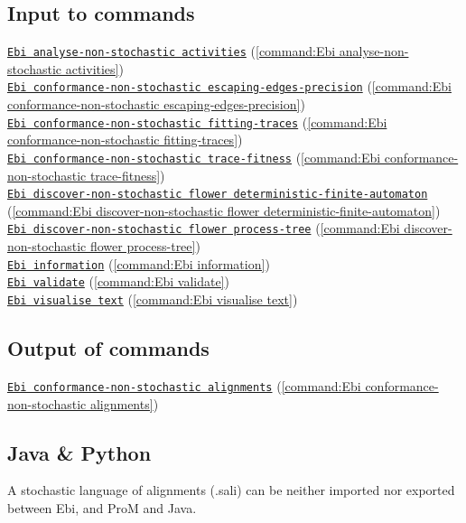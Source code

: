 {\subsection*{Input to commands} \null\qquad\hyperref[command:Ebi analyse-non-stochastic activities]{\texttt{Ebi analyse-non-stochastic activities}} (\cref{command:Ebi analyse-non-stochastic activities})\\\null\qquad\hyperref[command:Ebi conformance-non-stochastic escaping-edges-precision]{\texttt{Ebi conformance-non-stochastic escaping-edges-precision}} (\cref{command:Ebi conformance-non-stochastic escaping-edges-precision})\\\null\qquad\hyperref[command:Ebi conformance-non-stochastic fitting-traces]{\texttt{Ebi conformance-non-stochastic fitting-traces}} (\cref{command:Ebi conformance-non-stochastic fitting-traces})\\\null\qquad\hyperref[command:Ebi conformance-non-stochastic trace-fitness]{\texttt{Ebi conformance-non-stochastic trace-fitness}} (\cref{command:Ebi conformance-non-stochastic trace-fitness})\\\null\qquad\hyperref[command:Ebi discover-non-stochastic flower deterministic-finite-automaton]{\texttt{Ebi discover-non-stochastic flower deterministic-finite-automaton}} (\cref{command:Ebi discover-non-stochastic flower deterministic-finite-automaton})\\\null\qquad\hyperref[command:Ebi discover-non-stochastic flower process-tree]{\texttt{Ebi discover-non-stochastic flower process-tree}} (\cref{command:Ebi discover-non-stochastic flower process-tree})\\\null\qquad\hyperref[command:Ebi information]{\texttt{Ebi information}} (\cref{command:Ebi information})\\\null\qquad\hyperref[command:Ebi validate]{\texttt{Ebi validate}} (\cref{command:Ebi validate})\\\null\qquad\hyperref[command:Ebi visualise text]{\texttt{Ebi visualise text}} (\cref{command:Ebi visualise text})
\subsection*{Output of commands} \null\qquad\hyperref[command:Ebi conformance-non-stochastic alignments]{\texttt{Ebi conformance-non-stochastic alignments}} (\cref{command:Ebi conformance-non-stochastic alignments})
\subsection*{Java \& Python}
A stochastic language of alignments (.sali) can be neither imported nor exported between Ebi, and ProM and Java.
}
